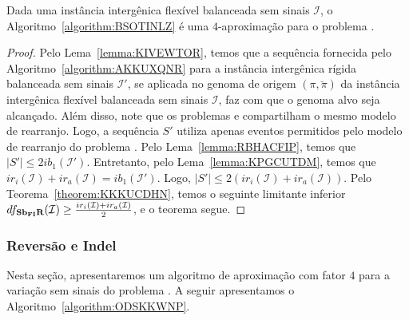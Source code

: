 

\begin{theorem}\label{theorem:WKATVVBS}
Dada uma instância intergênica flexível balanceada sem sinais $\mathcal{I}$, o Algoritmo~\ref{algorithm:BSOTINLZ} é uma $4$-aproximação para o problema \SbFIR{}.
\end{theorem}
\begin{proof}
Pelo Lema~\ref{lemma:KIVEWTOR}, temos que a sequência fornecida pelo Algoritmo~\ref{algorithm:AKKUXQNR} para a instância intergênica rígida balanceada sem sinais $\mathcal{I'}$, se aplicada no genoma de origem $(\pi,\breve\pi)$ da instância intergênica flexível balanceada sem sinais $\mathcal{I}$, faz com que o genoma alvo seja alcançado. Além disso, note que os problemas \SbIR{} e \SbFIR{} compartilham o mesmo modelo de rearranjo. Logo, a sequência $S'$ utiliza apenas eventos permitidos pelo modelo de rearranjo do problema \SbFIR{}. Pelo Lema~\ref{lemma:RBHACFIP}, temos que $|S'| \le 2ib_1(\mathcal{I'})$. Entretanto, pelo Lema~\ref{lemma:KPGCUTDM}, temos que $ir_i(\mathcal{I}) + ir_a(\mathcal{I}) = ib_1(\mathcal{I'})$. Logo, $|S'| \le 2(ir_i(\mathcal{I}) + ir_a(\mathcal{I}))$. Pelo Teorema~\ref{theorem:KKKUCDHN}, temos o seguinte limitante inferior $df_{\textbf{Sb\textsubscript{FI}R}}(\mathcal{I}) \ge \frac{ir_i(\mathcal{I}) + ir_a(\mathcal{I})}{2}$, e o teorema segue.
\end{proof}

\subsubsection{Reversão e Indel}

Nesta seção, apresentaremos um algoritmo de aproximação com fator $4$ para a variação sem sinais do problema \SbFIRI{}. A seguir apresentamos o Algoritmo~\ref{algorithm:ODSKKWNP}.



